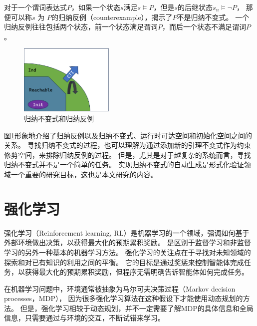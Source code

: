 对于一个谓词表达式$P$，如果一个状态$s$满足$s \models P$，但是$s$的后继状态$s_{n} \models \neg P$，
那便可以称$s$ 为 $P$的归纳反例（counterexample），揭示了$P$不是归纳不变式。
一个归纳反例往往包括两个状态，前一个状态满足谓词$P$，而后一个状态不满足谓词$P$。

\begin{figure}
    \centering
    \includegraphics[width=0.4\textwidth]{figures/ind_cti.pdf}
    \caption{归纳不变式和归纳反例}
    \label{fig:ind-cti}
\end{figure}
图\ref{fig:ind-cti}形象地介绍了归纳反例以及归纳不变式、运行时可达空间和初始化空间之间的关系。
寻找归纳不变式的过程，也可以理解为通过添加新的引理不变式作为约束修剪空间，来排除归纳反例的过程。
但是，尤其是对于越复杂的系统而言，寻找归纳不变式并不是一个简单的任务。
实现归纳不变式的自动生成是形式化验证领域一个重要的研究目标，这也是本文研究的内容。


\section{强化学习}
强化学习（Reinforcement learning, RL）\cite{rl}是机器学习的一个领域，强调如何基于外部环境做出决策，以获得最大化的预期累积奖励。
是区别于监督学习和非监督学习的另外一种基本的机器学习方法。
强化学习的关注点在于寻找对未知领域的探索和对已有知识的利用之间的平衡。
它的目标是通过奖惩来控制智能体完成任务，以获得最大化的预期累积奖励，但程序无需明确告诉智能体如何完成任务。

在机器学习问题中，环境通常被抽象为马尔可夫决策过程（Markov decision processes，MDP）\cite{markov}，
因为很多强化学习算法在这种假设下才能使用动态规划的方法。
但是，强化学习相较于动态规划，并不一定需要了解MDP的具体信息和全局信息，只需要通过与环境的交互，不断试错来学习。

